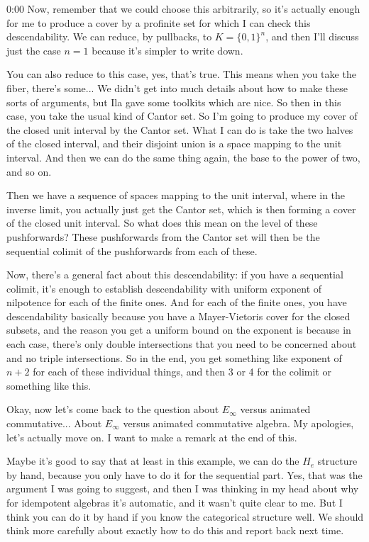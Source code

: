 \begin{unfinished}{0:00}
Now, remember that we could choose this arbitrarily, so it's actually enough for me to produce a cover by a profinite set for which I can check this descendability. We can reduce, by pullbacks, to $K = \{0,1\}^n$, and then I'll discuss just the case $n=1$ because it's simpler to write down.

You can also reduce to this case, yes, that's true. This means when you take the fiber, there's some... We didn't get into much details about how to make these sorts of arguments, but Ila gave some toolkits which are nice. So then in this case, you take the usual kind of Cantor set. So I'm going to produce my cover of the closed unit interval by the Cantor set. What I can do is take the two halves of the closed interval, and their disjoint union is a space mapping to the unit interval. And then we can do the same thing again, the base to the power of two, and so on. 

Then we have a sequence of spaces mapping to the unit interval, where in the inverse limit, you actually just get the Cantor set, which is then forming a cover of the closed unit interval. So what does this mean on the level of these pushforwards? These pushforwards from the Cantor set will then be the sequential colimit of the pushforwards from each of these.

Now, there's a general fact about this descendability: if you have a sequential colimit, it's enough to establish descendability with uniform exponent of nilpotence for each of the finite ones. And for each of the finite ones, you have descendability basically because you have a Mayer-Vietoris cover for the closed subsets, and the reason you get a uniform bound on the exponent is because in each case, there's only double intersections that you need to be concerned about and no triple intersections. So in the end, you get something like exponent of $n+2$ for each of these individual things, and then 3 or 4 for the colimit or something like this.

Okay, now let's come back to the question about $E_\infty$ versus animated commutative...
About $E_\infty$ versus animated commutative algebra. My apologies, let's actually move on. I want to make a remark at the end of this.

Maybe it's good to say that at least in this example, we can do the $H_e$ structure by hand, because you only have to do it for the sequential part. Yes, that was the argument I was going to suggest, and then I was thinking in my head about why for idempotent algebras it's automatic, and it wasn't quite clear to me. But I think you can do it by hand if you know the categorical structure well. We should think more carefully about exactly how to do this and report back next time.


\end{unfinished}

